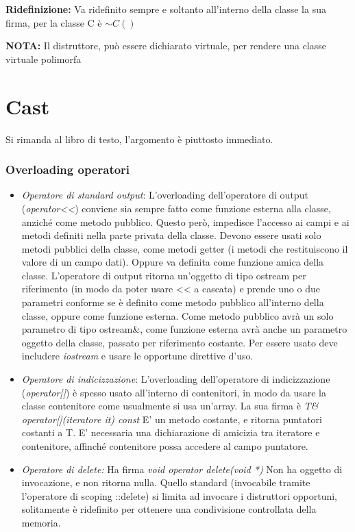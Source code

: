 \textbf{Ridefinizione:} Va ridefinito sempre e soltanto all'interno della classe la sua firma, per la classe C è $\sim C()$

\textbf{NOTA:} Il distruttore, può essere dichiarato virtuale, per rendere una classe virtuale polimorfa

\section{Cast}
Si rimanda al libro di testo, l'argomento è piuttosto immediato.

\subsubsection{Overloading operatori}

\begin{itemize}
	\item \textit{Operatore di standard output}: L'overloading dell'operatore di output (\textit{operator<<}) conviene sia sempre fatto come funzione esterna alla classe, anziché come metodo pubblico. Questo però, impedisce l'accesso ai campi e ai metodi definiti nella parte privata della classe. Devono essere usati solo metodi pubblici della classe, come metodi getter (i metodi che restituiscono il valore di un campo dati). Oppure va definita come funzione amica della classe. 
	L'operatore di output ritorna un'oggetto di tipo ostream per riferimento (in modo da poter usare << a cascata) e prende uno o due parametri conforme se è definito come metodo pubblico all'interno della classe, oppure come funzione esterna. Come metodo pubblico avrà un solo parametro di tipo ostream\&, come funzione esterna avrà anche un parametro oggetto della classe, passato per riferimento costante. Per essere usato deve includere \textit{iostream} e usare le opportune direttive d'uso.
	\item \textit{Operatore di indicizzazione}: L'overloading dell'operatore di indicizzazione (\textit{operator[]}) è spesso usato all'interno di contenitori, in modo da usare la classe contenitore come usualmente si usa un'array. La sua firma è \textit{T\& operator[](iteratore it) const} E' un metodo costante, e ritorna puntatori costanti a T. E' necessaria una dichiarazione di amicizia tra iteratore e contenitore, affinché contenitore possa accedere al campo puntatore. 
	\item \textit{Operatore di delete:} Ha firma \textit{void operator delete(void *)} Non ha oggetto di invocazione, e non ritorna nulla. Quello standard (invocabile tramite l'operatore di scoping ::delete) si limita ad invocare i distruttori opportuni, solitamente è ridefinito per ottenere una condivisione controllata della memoria.
\end{itemize} 

